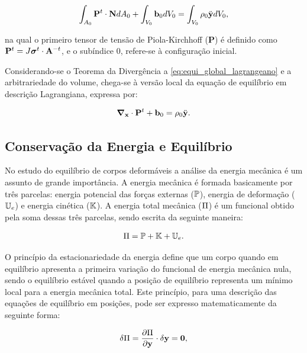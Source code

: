 \begin{align}
	\int_{A_0} \mathbf{P}^t \cdot \mathbf{N} dA_0 + \int_{V_0} \mathbf{b}_0 dV_0 = \int_{V_0} \rho_0  \ddot{\mathbf{y}} dV_0, \label{eq:equi_global_lagrangeano}
\end{align}

\noindent na qual o primeiro tensor de tensão de Piola-Kirchhoff ($\mathbf{P}$) é definido como $\mathbf{P}^t = J \boldsymbol{\sigma}^t \cdot \mathbf{A}^{-t}$, e o subíndice $0$, refere-se à configuração inicial.

Considerando-se o Teorema da Divergência a \autoref{eq:equi_global_lagrangeano} e a arbitrariedade do volume, chega-se à versão local da equação de equilíbrio em descrição Lagrangiana, expressa por:

\begin{align}
	\boldsymbol{\nabla}_{\mathbf{x}} \cdot \mathbf{P}^t +  \mathbf{b}_0 = \rho_0  \ddot{\mathbf{y}}. \label{eq:equi_local_lagrangeano}
\end{align}


\subsection{Conservação da Energia e Equilíbrio}

No estudo do equilíbrio de corpos deformáveis a análise da energia mecânica é um assunto de grande importância. A energia mecânica é formada basicamente por três parcelas: energia potencial das forças externas ($\mathbb{P}$), energia de deformação ($\mathbb{U}_e$) e energia cinética ($\mathbb{K}$). A energia total mecânica ($\Pi$) é um funcional obtido pela soma dessas três parcelas, sendo escrita da seguinte maneira:

\begin{align}
	\Pi = \mathbb{P} + \mathbb{K} + \mathbb{U}_e.
\end{align}

O princípio da estacionariedade da energia define que um corpo quando em equilíbrio apresenta a primeira variação do funcional de energia mecânica nula, sendo o equilíbrio estável quando a posição de equilíbrio representa um mínimo local para a energia mecânica total. Este princípio, para uma descrição das equações de equilíbrio em posições, pode ser expresso matematicamente da seguinte forma:

\begin{align}
	\delta\Pi = \frac{\partial{\Pi}}{\partial{\mathbf{y}}} \cdot \delta\mathbf{y} = \mathbf{0}, \label{eq:princ_esta}
\end{align}

